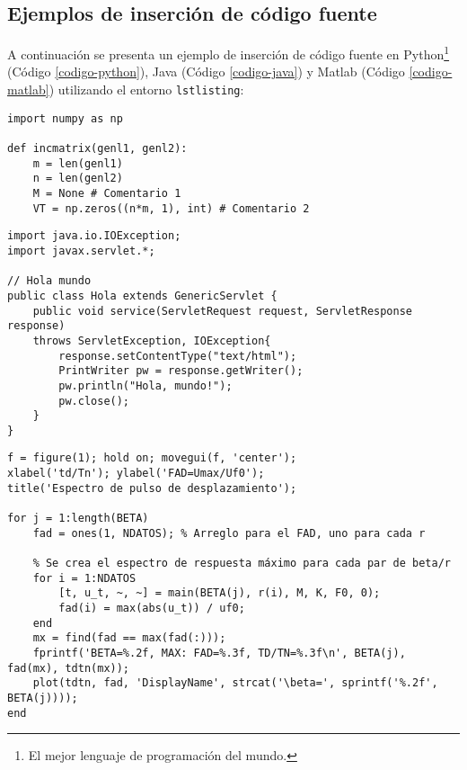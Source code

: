 		\lipsum[4]
		
		\begin{multicols}{2}
			
			\lipsum[4]
			
			
			\lipsum[1]
			
		\end{multicols}
		
	\subsection{Ejemplos de inserción de código fuente}
		
		A continuación se presenta un ejemplo de inserción de código fuente en Python\footnote{El mejor lenguaje de programación del mundo.} (Código \ref{codigo-python}), Java (Código \ref{codigo-java}) y Matlab (Código \ref{codigo-matlab}) utilizando el entorno \texttt{lstlisting}:
		
\begin{lstlisting}[style=Python, caption={Ejemplo en Python.\label{codigo-python}}]
import numpy as np

def incmatrix(genl1, genl2):
	m = len(genl1)
	n = len(genl2)
	M = None # Comentario 1
	VT = np.zeros((n*m, 1), int) # Comentario 2
\end{lstlisting}

\begin{lstlisting}[style=Java, caption={Ejemplo en Java.\label{codigo-java}}]
import java.io.IOException; 
import javax.servlet.*;

// Hola mundo
public class Hola extends GenericServlet {
	public void service(ServletRequest request, ServletResponse response)
	throws ServletException, IOException{
		response.setContentType("text/html");
		PrintWriter pw = response.getWriter();
		pw.println("Hola, mundo!");
		pw.close();
	}
}
\end{lstlisting}

\begin{lstlisting}[style=Matlab, caption={Ejemplo en Matlab.\label{codigo-matlab}}]
% Se crea gráfico
f = figure(1); hold on; movegui(f, 'center');
xlabel('td/Tn'); ylabel('FAD=Umax/Uf0');
title('Espectro de pulso de desplazamiento');

for j = 1:length(BETA)
	fad = ones(1, NDATOS); % Arreglo para el FAD, uno para cada r
	
	% Se crea el espectro de respuesta máximo para cada par de beta/r
	for i = 1:NDATOS
		[t, u_t, ~, ~] = main(BETA(j), r(i), M, K, F0, 0);
		fad(i) = max(abs(u_t)) / uf0;
	end
	mx = find(fad == max(fad(:)));
	fprintf('BETA=%.2f, MAX: FAD=%.3f, TD/TN=%.3f\n', BETA(j), fad(mx), tdtn(mx));
	plot(tdtn, fad, 'DisplayName', strcat('\beta=', sprintf('%.2f', BETA(j))));
end
\end{lstlisting}


